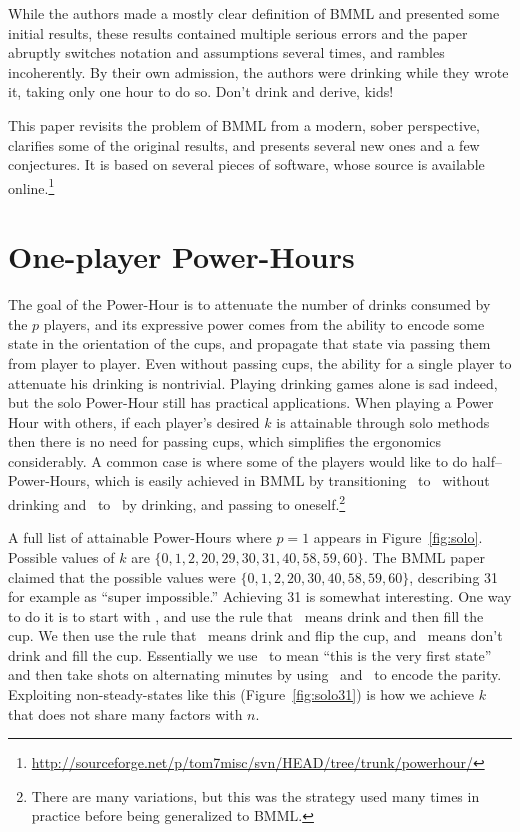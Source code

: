 \documentclass[twocolumn]{article}
\begin{document}
While the authors made a mostly clear definition of BMML and presented
some initial results, these results contained multiple serious errors
and the paper abruptly switches notation and assumptions several
times, and rambles incoherently. By their own admission, the authors
were drinking while they wrote it, taking only one hour to do so.
Don't drink and derive, kids!

This paper revisits the problem of BMML from a modern, sober
perspective, clarifies some of the original results, and presents
several new ones and a few conjectures. It is based on several pieces
of software, whose source is available online.\!\footnote{ \url{http://sourceforge.net/p/tom7misc/svn/HEAD/tree/trunk/powerhour/} }

\section{One-player \kn Power-Hours}

The goal of the \kn Power-Hour is to attenuate the number of drinks
consumed by the $p$ players, and its expressive power comes from the
ability to encode some state in the orientation of the cups, and
propagate that state via passing them from player to player. Even
without passing cups, the ability for a single player to attenuate his
drinking is nontrivial. Playing drinking games alone is sad indeed,
but the solo \kn Power-Hour still has practical applications. When
playing a Power Hour with others, if each player's desired $k$ is
attainable through solo methods then there is no need for passing
cups, which simplifies the ergonomics considerably. A common case is
where some of the players would like to do half--Power-Hours, which is
easily achieved in BMML by transitioning \emptycup\ to \fullcup\ without
drinking and \fullcup\ to \emptycup\ by drinking, and passing to
oneself.\!\footnote{There are many variations, but this was the
  strategy used many times in practice before being generalized to
  BMML.}

A full list of attainable \kn Power-Hours where $p=1$ appears in
Figure~\ref{fig:solo}. Possible values of $k$ are $\{ 0, 1, 2, 20, 29,
30, 31, 40, 58, 59, 60 \}$. The BMML paper claimed that the possible
values were $\{0, 1, 2, 20, 30, 40, 58, 59, 60 \}$, describing 31 for
example as ``super impossible.'' Achieving 31 is somewhat interesting.
One way to do it is to start with \emptycup, and use the rule that
\emptycup\ means drink and then fill the cup. We then use the rule
that \fullcup\ means drink and flip the cup, and \overcup\ means don't
drink and fill the cup. Essentially we use \emptycup\ to mean ``this
is the very first state'' and then take shots on alternating minutes
by using \overcup\ and \fullcup\ to encode the parity. Exploiting
non-steady-states like this (Figure~\ref{fig:solo31}) is how we
achieve $k$ that does not share many factors with $n$.
\end{document}

